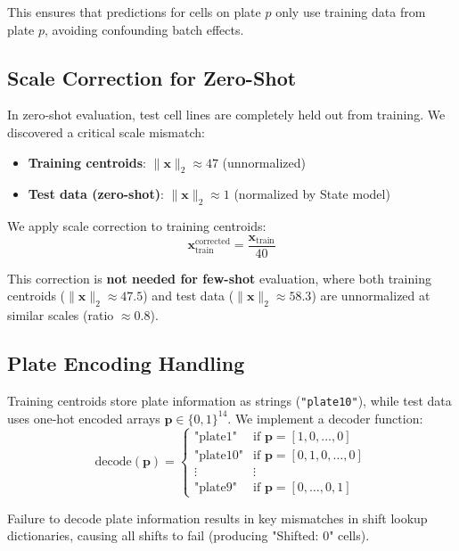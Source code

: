 \documentclass[conference]{IEEEtran}
\begin{document}
This ensures that predictions for cells on plate $p$ only use training data from plate $p$, avoiding confounding batch effects.

\subsection{Scale Correction for Zero-Shot}

In zero-shot evaluation, test cell lines are completely held out from training. We discovered a critical scale mismatch:
\begin{itemize}
    \item \textbf{Training centroids}: $\|\mathbf{x}\|_2 \approx 47$ (unnormalized)
    \item \textbf{Test data (zero-shot)}: $\|\mathbf{x}\|_2 \approx 1$ (normalized by State model)
\end{itemize}

We apply scale correction to training centroids:
\begin{equation}
\mathbf{x}_{\text{train}}^{\text{corrected}} = \frac{\mathbf{x}_{\text{train}}}{40}
\end{equation}

This correction is \textbf{not needed for few-shot} evaluation, where both training centroids ($\|\mathbf{x}\|_2 \approx 47.5$) and test data ($\|\mathbf{x}\|_2 \approx 58.3$) are unnormalized at similar scales (ratio $\approx 0.8$).

\subsection{Plate Encoding Handling}

Training centroids store plate information as strings (\texttt{"plate10"}), while test data uses one-hot encoded arrays $\mathbf{p} \in \{0,1\}^{14}$. We implement a decoder function:
\begin{equation}
\text{decode}(\mathbf{p}) = \begin{cases}
\text{"plate1"} & \text{if } \mathbf{p} = [1,0,\ldots,0] \\
\text{"plate10"} & \text{if } \mathbf{p} = [0,1,0,\ldots,0] \\
\vdots & \vdots \\
\text{"plate9"} & \text{if } \mathbf{p} = [0,\ldots,0,1]
\end{cases}
\end{equation}

Failure to decode plate information results in key mismatches in shift lookup dictionaries, causing all shifts to fail (producing "Shifted: 0" cells).
\end{document}
